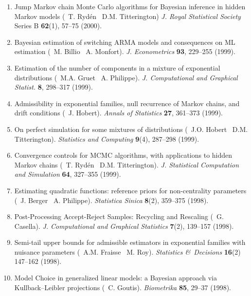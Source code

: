 \begin{enumerate}
\item Jump Markov chain Monte Carlo algorithms for
Bayesian inference in hidden Markov models (\avec\ T. Ryd\'en \et\ D.M. Titterington)
{\it J. Royal Statistical Society} Series B {\bf 62}(1), 57--75 (2000).

\item Bayesian estimation of switching ARMA models and consequences
on ML estimation (\avec\ M. Billio \et\ A. Monfort). 
{\it J. Econometrics} {\bf 93}, 229--255 (1999).

\item Estimation of the number of components in a mixture 
of exponential distributions (\avec\ M.A. Gruet \et\ A. Philippe). 
{\it J. Computational and Graphical Statist.} {\bf 8}, 298--317 (1999).

\item Admissibility in exponential families, null recurrence
of Markov chains, and drift conditions (\avec\ J. Hobert).
{\it Annals of Statistics} {\bf 27}, 361--373 (1999).

\item On perfect simulation for some mixtures of distributions
(\avec\ J.O. Hobert \et\ D.M. Titterington). 
{\it Statistics and Computing} {\bf 9}(4), 287--298 (1999).

\item Convergence controls for MCMC algorithms, with applications 
to hidden Markov chains (\avec\ T. Ryd\'en \et\ D.M. Titterington).
{\it J. Statistical Computation and Simulation} {\bf 64}, 327--355 (1999).

\item Estimating quadratic functions:
reference priors for non-centrality parameters (\avec\  J. Berger \et\
A. Philippe). {\it Statistica Sinica} {\bf 8}(2), 359--375 (1998).

\item Post-Processing Accept-Reject Samples: Recycling and Rescaling (\avec\
G. Casella). {\it J. Computational and Graphical Statistics} 
{\bf 7}(2), 139--157 (1998). 

\item Semi-tail upper bounds for admissible estimators in exponential 
families with nuisance parameters (\avec\  A.M. Fraisse \et\  M. Roy).
{\it Statistics \&\ Decisions} {\bf 16}(2) 147--162 (1998).

\item Model Choice in generalized linear models: a Bayesian
approach via Kullback--Leibler projections (\avec\  C. Goutis).
{\it Bio\-me\-tri\-ka} {\bf 85}, 29--37 (1998). 


\end{enumerate}
